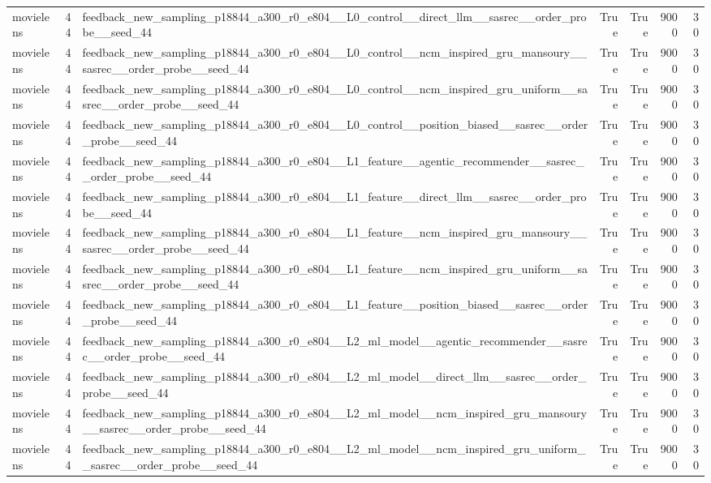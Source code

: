 \begin{table}[htbp!]
\begin{tabular}{lrlrrrr}
movielens & 44 & feedback\_new\_sampling\_p18844\_a300\_r0\_e804\_\_L0\_control\_\_direct\_llm\_\_sasrec\_\_order\_probe\_\_seed\_44 & True & True & 9000 & 30 \\
movielens & 44 & feedback\_new\_sampling\_p18844\_a300\_r0\_e804\_\_L0\_control\_\_ncm\_inspired\_gru\_mansoury\_\_sasrec\_\_order\_probe\_\_seed\_44 & True & True & 9000 & 30 \\
movielens & 44 & feedback\_new\_sampling\_p18844\_a300\_r0\_e804\_\_L0\_control\_\_ncm\_inspired\_gru\_uniform\_\_sasrec\_\_order\_probe\_\_seed\_44 & True & True & 9000 & 30 \\
movielens & 44 & feedback\_new\_sampling\_p18844\_a300\_r0\_e804\_\_L0\_control\_\_position\_biased\_\_sasrec\_\_order\_probe\_\_seed\_44 & True & True & 9000 & 30 \\
movielens & 44 & feedback\_new\_sampling\_p18844\_a300\_r0\_e804\_\_L1\_feature\_\_agentic\_recommender\_\_sasrec\_\_order\_probe\_\_seed\_44 & True & True & 9000 & 30 \\
movielens & 44 & feedback\_new\_sampling\_p18844\_a300\_r0\_e804\_\_L1\_feature\_\_direct\_llm\_\_sasrec\_\_order\_probe\_\_seed\_44 & True & True & 9000 & 30 \\
movielens & 44 & feedback\_new\_sampling\_p18844\_a300\_r0\_e804\_\_L1\_feature\_\_ncm\_inspired\_gru\_mansoury\_\_sasrec\_\_order\_probe\_\_seed\_44 & True & True & 9000 & 30 \\
movielens & 44 & feedback\_new\_sampling\_p18844\_a300\_r0\_e804\_\_L1\_feature\_\_ncm\_inspired\_gru\_uniform\_\_sasrec\_\_order\_probe\_\_seed\_44 & True & True & 9000 & 30 \\
movielens & 44 & feedback\_new\_sampling\_p18844\_a300\_r0\_e804\_\_L1\_feature\_\_position\_biased\_\_sasrec\_\_order\_probe\_\_seed\_44 & True & True & 9000 & 30 \\
movielens & 44 & feedback\_new\_sampling\_p18844\_a300\_r0\_e804\_\_L2\_ml\_model\_\_agentic\_recommender\_\_sasrec\_\_order\_probe\_\_seed\_44 & True & True & 9000 & 30 \\
movielens & 44 & feedback\_new\_sampling\_p18844\_a300\_r0\_e804\_\_L2\_ml\_model\_\_direct\_llm\_\_sasrec\_\_order\_probe\_\_seed\_44 & True & True & 9000 & 30 \\
movielens & 44 & feedback\_new\_sampling\_p18844\_a300\_r0\_e804\_\_L2\_ml\_model\_\_ncm\_inspired\_gru\_mansoury\_\_sasrec\_\_order\_probe\_\_seed\_44 & True & True & 9000 & 30 \\
movielens & 44 & feedback\_new\_sampling\_p18844\_a300\_r0\_e804\_\_L2\_ml\_model\_\_ncm\_inspired\_gru\_uniform\_\_sasrec\_\_order\_probe\_\_seed\_44 & True & True & 9000 & 30 \\

\end{tabular}
\end{table}
